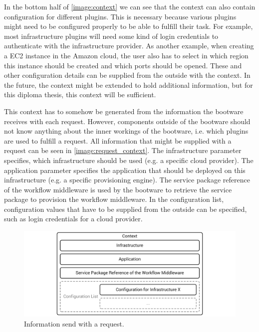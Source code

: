 In the bottom half of \autoref{image:context} we can see that the context can also contain configuration for different plugins.
This is necessary because various plugins might need to be configured properly to be able to fulfill their task.
For example, most infrastructure plugins will need some kind of login credentials to authenticate with the infrastructure provider.
As another example, when creating a EC2 instance in the Amazon cloud, the user also has to select in which region this instance should be created and which ports should be opened.
These and other configuration details can be supplied from the outside with the context.
In the future, the context might be extended to hold additional information, but for this diploma thesis, this context will be sufficient.

This context has to somehow be generated from the information the bootware receives with each request.
However, components outside of the bootware should not know anything about the inner workings of the bootware, i.e. which plugins are used to fulfill a request.
All information that might be supplied with a request can be seen in \autoref{image:request_context}.
The infrastructure parameter specifies, which infrastructure should be used (e.g. a specific cloud provider).
The application parameter specifies the application that should be deployed on this infrastructure (e.g. a specific provisioning engine).
The service package reference of the workflow middleware is used by the bootware to retrieve the service package to provision the workflow middleware.
In the configuration list, configuration values that have to be supplied from the outside can be specified, such as login credentials for a cloud provider.

\begin{figure}[!htbp]
	\centering
	\includegraphics[resolution=600]{design/assets/request_context}
	\caption{Information send with a request.}
	\label{image:request_context}
\end{figure}

